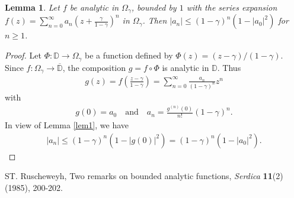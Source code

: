 \documentclass[10pt,a4paper]{amsart}
\newtheorem{lem}{Lemma}
\newcommand{\beas}{\begin{eqnarray*}}
\newcommand{\eeas}{\end{eqnarray*}}
\newcommand{\ol}{\overline}
\begin{document}
\begin{lem}\label{lem2}Let $f$ be analytic in $\Omega_{\gamma}$, bounded by $1$ with the series expansion $f(z)=\sum_{n=0}^\infty a_n\left(z+\frac{\gamma}{1-\gamma}\right)^n$ in $\Omega_{\gamma}$. Then $|a_n|\leq (1-\gamma)^n(1-|a_0|^2)$ for $n\geq 1$.\end{lem}

\begin{proof} Let $\Phi : \mathbb{D}\to\Omega_{\gamma}$ be a function defined by $\Phi(z)=(z-\gamma)/(1-\gamma)$. Since $f : \Omega_{\gamma}\to\ol{\mathbb{D}}$, 
the composition $g=f\circ \Phi$ is analytic in $\mathbb{D}$. Thus 
\beas g(z)=f\left(\frac{z-\gamma}{1-\gamma}\right)=\sum_{n=0}^\infty \frac{a_n}{(1-\gamma)^n}z^n\eeas
with
\beas g(0)=a_0\quad\text{and}\quad a_n=\frac{g^{(n)}(0)}{n!}(1-\gamma)^n.\eeas
In view of \textrm{Lemma \ref{lem1}}, we have 
\beas|a_n|\leq (1-\gamma)^n\left(1-|g(0)|^2\right)=(1-\gamma)^n\left(1-|a_0|^2\right).\eeas\end{proof}

\begin{thebibliography}{99}
 {\sc ST. Ruscheweyh}, Two remarks on bounded analytic functions, {\it Serdica} {\bf11}(2) (1985), 200-202.
\end{thebibliography}
\end{document}
